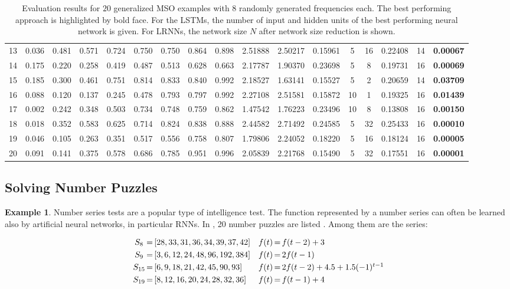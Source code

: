 \documentclass{sn-jnl}
\theoremstyle{definition}
\newtheorem{exmp}{Example}
\begin{document}
\begin{table}
\begin{tabular}{c*{8}{p{8mm}}cccc@{\,+\,}cccc}
	13 & 0.036 & 0.481 & 0.571 & 0.724 & 0.750 & 0.750 & 0.864 & 0.898 & 2.51888 & 2.50217 & 0.15961 & 5 & 16 & 0.22408 & 14 & \textbf{0.00067}\\
	14 & 0.175 & 0.220 & 0.258 & 0.419 & 0.487 & 0.513 & 0.628 & 0.663 & 2.17787 & 1.90370 & 0.23698 & 5 & 8 & 0.19731 & 16 & \textbf{0.00069}\\
	15 & 0.185 & 0.300 & 0.461 & 0.751 & 0.814 & 0.833 & 0.840 & 0.992 & 2.18527 & 1.63141 & 0.15527 & 5 & 2 & 0.20659 & 14 & \textbf{0.03709}\\
	16 & 0.088 & 0.120 & 0.137 & 0.245 & 0.478 & 0.793 & 0.797 & 0.992 & 2.27108 & 2.51581 & 0.15872 & 10 & 1 & 0.19325 & 16 & \textbf{0.01439}\\
	17 & 0.002 & 0.242 & 0.348 & 0.503 & 0.734 & 0.748 & 0.759 & 0.862 & 1.47542 & 1.76223 & 0.23496 & 10 & 8 & 0.13808 & 16 & \textbf{0.00150}\\
	18 & 0.018 & 0.352 & 0.583 & 0.625 & 0.714 & 0.824 & 0.838 & 0.888 & 2.44582 & 2.71492 & 0.24585 & 5 & 32 & 0.25433 & 16 & \textbf{0.00010}\\
	19 & 0.046 & 0.105 & 0.263 & 0.351 & 0.517 & 0.556 & 0.758 & 0.807 & 1.79806 & 2.24052 & 0.18220 & 5 & 16 & 0.18124 & 16 & \textbf{0.00005}\\
	20 & 0.091 & 0.141 & 0.375 & 0.578 & 0.686 & 0.785 & 0.951 & 0.996 & 2.05839 & 2.21768 & 0.15490 & 5 & 32 & 0.17551 & 16 & \textbf{0.00001}\\
	\bottomrule
  \end{tabular}
\caption{Evaluation results for $20$ generalized MSO examples with $8$ randomly
generated frequencies each. The best performing approach is highlighted by bold
face. For the LSTMs, the number of input and hidden units of the best performing
neural network is given. For LRNNs, the network size $N$ after network size
reduction is shown.}
\label{sideways}
\end{table}

\subsection{Solving Number Puzzles}

\begin{exmp}
Number series tests are a popular type of intelligence test. The function
represented by a number series can often be learned also by artificial neural
networks, in particular RNNs. In \citep{GW13}, 20 number puzzles are listed \citep[cf.][]{RK11}.
Among them are the series:

\[ \begin{array}{c@{\,=\,}lc@{\,=\,}l}
	S_8 & [28,33,31,36,34,39,37,42] & f(t) & f(t-2) + 3\\[3pt]
	S_9 & [3,6,12,24,48,96,192,384] & f(t) & 2 f(t-1)\\[3pt]
	S_{15} & [6,9,18,21,42,45,90,93] & f(t) & 2 f(t-2) + 4.5 + 1.5 (-1)^{t-1}\\[3pt]
	S_{19} & [8,12,16,20,24,28,32,36] & f(t) & f(t-1) + 4
\end{array} \]
\end{exmp}
\end{document}
